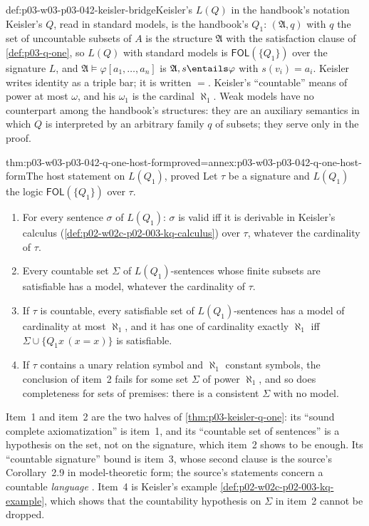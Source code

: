 \begin{hbconvention}{def:p03-w03-p03-042-keisler-bridge}{Keisler's \(L(Q)\) in the handbook's notation}
Keisler's \(Q\), read in standard models, is the handbook's \(Q_1\):
\((\mathfrak A,q)\) with \(q\) the set of uncountable subsets of \(A\) is
the structure \(\mathfrak A\) with the satisfaction clause of
\cref{def:p03-q-one}, so \(L(Q)\) with standard models is
\(\mathsf{FOL}(\{Q_1\})\) over the signature \(L\), and
\(\mathfrak A\models\varphi[a_1,\ldots,a_n]\) is
\(\mathfrak A,s\entails\varphi\) with \(s(v_i)=a_i\).  Keisler writes
identity as a triple bar; it is written \(=\).  Keisler's ``countable''
means of power at most \(\omega\), and his \(\omega_1\) is the cardinal
\(\aleph_1\).  Weak models have no counterpart among the handbook's
structures: they are an auxiliary semantics in which \(Q\) is interpreted
by an arbitrary family \(q\) of subsets; they serve only in the proof.
\end{hbconvention}

\begin{hbtheorem}{thm:p03-w03-p03-042-q-one-host-form}{proved=annex:p03-w03-p03-042-q-one-host-form}{The host statement on \(L(Q_1)\), proved}
Let \(\tau\) be a signature and \(L(Q_1)\) the logic
\(\mathsf{FOL}(\{Q_1\})\) over \(\tau\).
\begin{enumerate}
\item For every sentence \(\sigma\) of \(L(Q_1)\): \(\sigma\) is valid iff it
      is derivable in Keisler's calculus
      (\cref{def:p02-w02c-p02-003-kq-calculus}) over \(\tau\), whatever the
      cardinality of \(\tau\).
\item Every countable set \(\Sigma\) of \(L(Q_1)\)-sentences whose finite
      subsets are satisfiable has a model, whatever the cardinality of
      \(\tau\).
\item If \(\tau\) is countable, every satisfiable set of
      \(L(Q_1)\)-sentences has a model of cardinality at most \(\aleph_1\),
      and it has one of cardinality exactly \(\aleph_1\) iff
      \(\Sigma\cup\{Q_1x\,(x=x)\}\) is satisfiable.
\item If \(\tau\) contains a unary relation symbol and \(\aleph_1\)
      constant symbols, the conclusion of item~2 fails for some set
      \(\Sigma\) of power \(\aleph_1\), and so does completeness for sets of
      premises: there is a consistent \(\Sigma\) with no model.
\end{enumerate}
\end{hbtheorem}

Item~1 and item~2 are the two halves of \cref{thm:p03-keisler-q-one}:
its ``sound complete axiomatization'' is item~1, and its ``countable set
of sentences'' is a hypothesis on the set, not on the signature, which
item~2 shows to be enough.  Its ``countable signature'' bound is item~3,
whose second clause is the source's Corollary~2.9 in model-theoretic
form; the source's statements concern a countable \emph{language}
\cite[\S2, Corollary~2.9, p.~26]{Keisler1970}.  Item~4 is Keisler's
example \cref{def:p02-w02c-p02-003-kq-example}, which shows that the
countability hypothesis on \(\Sigma\) in item~2 cannot be dropped.


